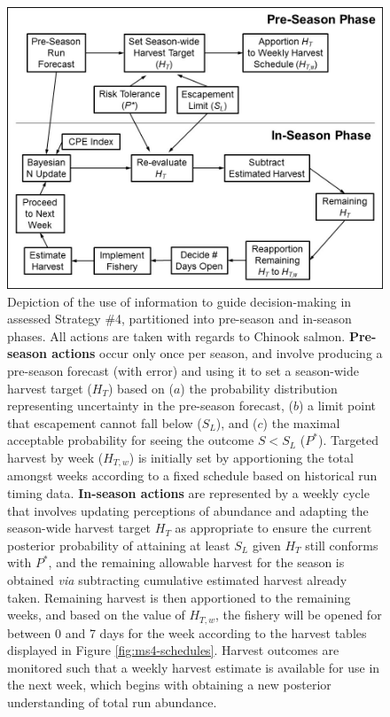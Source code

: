 \documentclass[12pt,]{book}
\theoremstyle{definition}
\theoremstyle{definition}
\theoremstyle{definition}
\theoremstyle{remark}
\begin{document}
\begin{singlespace}
\begin{figure}
  \centering
  \includegraphics{img/Ch3/ms4-flow-diag.jpg}
  \caption{Depiction of the use of information to guide decision-making in assessed Strategy \#4, partitioned into pre-season and in-season phases. All actions are taken with regards to Chinook salmon. \textbf{Pre-season actions} occur only once per season, and involve producing a pre-season forecast (with error) and using it to set a season-wide harvest target ($H_T$) based on ($a$) the probability distribution representing uncertainty in the pre-season forecast, ($b$) a limit point that escapement cannot fall below ($S_L$), and ($c$) the maximal acceptable probability for seeing the outcome $S < S_L$ ($P^*$). Targeted harvest by week ($H_{T,w}$) is initially set by apportioning the total amongst weeks according to a fixed schedule based on historical run timing data. \textbf{In-season actions} are represented by a weekly cycle that involves updating perceptions of abundance and adapting the season-wide harvest target $H_T$ as appropriate to ensure the current posterior probability of attaining at least $S_L$ given $H_T$ still conforms with $P^*$, and the remaining allowable harvest for the season is obtained \textit{via} subtracting cumulative estimated harvest already taken. Remaining harvest is then apportioned to the remaining weeks, and based on the value of $H_{T,w}$, the fishery will be opened for between 0 and 7 days for the week according to the harvest tables displayed in Figure \ref{fig:ms4-schedules}. Harvest outcomes are monitored such that a weekly harvest estimate is available for use in the next week, which begins with obtaining a new posterior understanding of total run abundance.}
  \label{fig:ms4-flow-diag}
\end{figure}


\end{singlespace}
\end{document}
